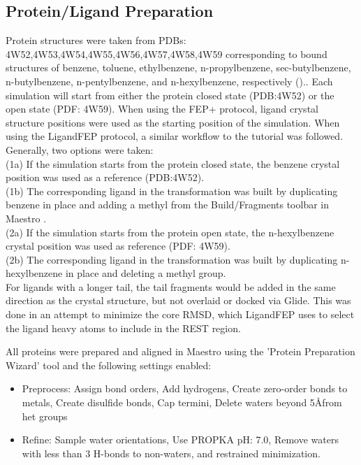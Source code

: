 \documentclass[journal=jctcce,manuscript=article]{achemso}
\begin{document}
\subsection*{Protein/Ligand Preparation}
Protein structures were taken from PDBs: 4W52,4W53,4W54,4W55,4W56,4W57,4W58,4W59 corresponding to bound structures of benzene, toluene, ethylbenzene, n-propylbenzene, sec-butylbenzene, n-butylbenzene, n-pentylbenzene, and n-hexylbenzene, respectively (\cite{Merski2015})..
Each simulation will start from either the protein closed state (PDB:4W52) or the open state (PDF: 4W59).
When using the FEP+ protocol, ligand crystal structure positions were used as the starting position of the simulation.
When using the LigandFEP protocol, a similar workflow to the tutorial \cite{LigandFEP} was followed.
Generally, two options were taken:\\
(1a) If the simulation starts from the protein closed state, the benzene crystal position was used as a reference (PDB:4W52).\\
(1b) The corresponding ligand in the transformation was built by duplicating benzene in place and adding a methyl from the Build/Fragments toolbar in Maestro \cite{Maestro}.\\
(2a) If the simulation starts from the protein open state, the n-hexylbenzene crystal position was used as reference (PDF: 4W59).\\
(2b) The corresponding ligand in the transformation was built by duplicating n-hexylbenzene in place and deleting a methyl group.\\
For ligands with a longer tail, the tail fragments would be added in the same direction as the crystal structure, but not overlaid or docked via Glide.
This was done in an attempt to minimize the core RMSD, which LigandFEP uses to select the ligand heavy atoms to include in the REST region. 

All proteins were prepared and aligned in Maestro \cite{Maestro} using the 'Protein Preparation Wizard' \cite{ProteinPrepWizSoftware,ProteinPrepWizPaper} tool and the following settings enabled:
   \begin{itemize}
   \item Preprocess: Assign bond orders, Add hydrogens, Create zero-order bonds to metals, Create disulfide bonds, Cap termini, Delete waters beyond 5\AA from het groups
   \item Refine: Sample water orientations, Use PROPKA pH: 7.0, Remove waters with less than 3 H-bonds to non-waters, and restrained minimization.
   \end{itemize}
\end{document}

